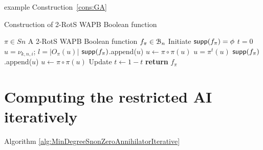 \documentclass[11pt]{llncs}
\begin{document}
example Construction~\ref{cons:GA}

\begin{constr}
	\caption{Construction of 2-RotS WAPB Boolean function\label{cons:GA}}
	\begin{algorithmic}
		\Require $\pi \in Sn$ %
		\Ensure A 2-RotS WAPB Boolean function $f_\pi \in \mathcal{B}_n$
		\State Initiate $\mathsf{supp}(f_\pi) = \phi$
		\State $t = 0$
		\State $u = \nu_{k,n,i}$; $l= |O_\pi(u)|$
		\State $\mathsf{supp}(f_\pi)$.append($u$)
		\State $ u \gets \pi \circ \pi(u)$
		\EndFor
		\Else
		\State $u = \pi^{t}(u)$
		\State $\mathsf{supp}(f_\pi)$.append($u$)
		\State $ u \gets \pi \circ \pi(u)$ 
		\EndFor 
		\State Update $t \gets 1 - t$
		\EndIf
		\EndFor
		\EndFor
		\State \textbf{return} $f_\pi$
	\end{algorithmic}
	
\end{constr}

\section{Computing the restricted AI iteratively}\label{sec:IterativeApproach}
Algorithm \ref{alg:MinDegreeSnonZeroAnnihilatorIterative}
\end{document}
